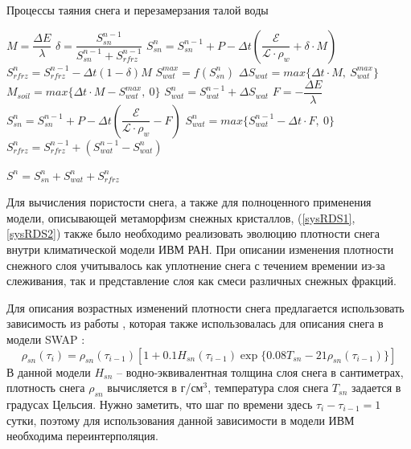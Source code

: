 \documentclass[a4paper, fontsize=14pt]{scrartcl}
\begin{document}
\begin{algorithm}[H]
\caption{Процессы таяния снега и перезамерзания талой воды}
\label{alg:setup}
\begin{algorithmic}[]
        \State $ M = \dfrac{\Delta E}{\lambda} $ 
        \State $ \delta = \dfrac{S_{sn}^{n-1}}{S_{sn}^{n-1} + S_{rfrz}^{n - 1}}$ 
        \State $ S_{sn}^n = S_{sn}^{n-1} + P - \Delta t \left( \dfrac{\mathcal{E}}{\mathcal{L} \cdot \rho_w} + \delta \cdot M \right) $ 
        \State $ S_{rfrz}^n = S_{rfrz}^{n - 1} - \Delta t (1 - \delta)M $ 
        \State $ S_{wat}^{max} = f( S_{sn}^n ) $
        \State $ \Delta S_{wat} = max\{\Delta t \cdot M, ~S_{wat}^{max}\} $ 
        \State $ M_{soil} = max\{\Delta t \cdot M - S_{wat}^{max}, ~0\} $ 
        \State $ S_{wat}^n = S_{wat}^{n-1} + \Delta S_{wat} $ 
    \Else
            \State $F = -\dfrac{\Delta E}{\lambda}$
            \State $S_{sn}^n = S_{sn}^{n-1} + P - \Delta t \left( \dfrac{\mathcal{E}}{\mathcal{L} \cdot \rho_w} - F \right)$
            \State $S_{wat}^n = max\{ S_{wat}^{n-1} - \Delta t \cdot F, ~0\}$
            \State $S_{rfrz}^n = S_{rfrz}^{n - 1} + ( S_{wat}^{n-1} - S_{wat}^n )$
            
        \EndIf
    \EndIf
    \State $S^n = S_{sn}^n + S_{wat}^n + S_{rfrz}^n$
\end{algorithmic}
\end{algorithm}

Для вычисления пористости снега, а также для полноценного применения модели, описывающей метаморфизм снежных кристаллов, (\eqref{sysRDS1}, \eqref{sysRDS2}) также было необходимо реализовать эволюцию плотности снега внутри климатической модели ИВМ РАН. При описании изменения плотности снежного слоя учитывалось как уплотнение снега с течением времении из-за слеживания, так и представление слоя как смеси различных снежных фракций. 

Для описания возрастных изменений плотности снега предлагается использовать зависимость из работы \cite{YOSIDA1955}, которая также использовалась для описания снега в модели SWAP \cite{Gusev2002} :
\begin{equation}
    \rho_{sn}(\tau_i) = \rho_{sn}(\tau_{i-1}) \left[  1 + 0.1 H_{sn}(\tau_{i-1}) \exp \{ 0.08 T_{sn} - 21 \rho_{sn}(\tau_{i-1})  \} \right]    \label{sysRHOOLD}  
\end{equation}
В данной модели $H_{sn}$ -- водно-эквивалентная толщина слоя снега в сантиметрах, плотность снега $\rho_{sn}$ вычисляется в г/см$^3$, температура слоя снега $T_{sn}$ задается в градусах Цельсия. Нужно заметить, что шаг по времени здесь $\tau_{i} - \tau_{i-1} = 1$ сутки, поэтому для использования данной зависимости в модели ИВМ необходима переинтерполяция.
\end{document}
